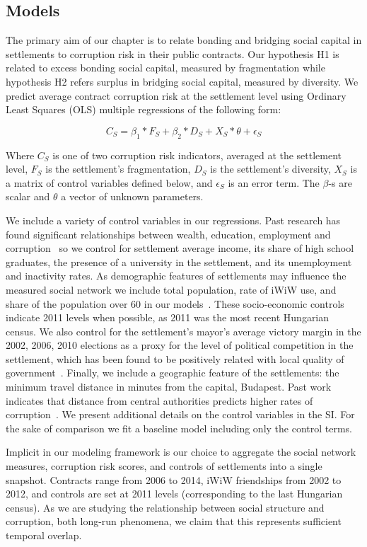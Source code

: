 \subsection{Models}
The primary aim of our chapter is to relate bonding and bridging social capital in settlements to corruption risk in their public contracts. Our hypothesis H1 is related to excess bonding social capital, measured by fragmentation while hypothesis H2 refers surplus in bridging social capital, measured by diversity. We predict average contract corruption risk at the settlement level using Ordinary Least Squares (OLS) multiple regressions of the following form:

$$C_{S} = \beta_{1} * F_{S} + \beta_{2}*D_{S} + X_{S}*\theta + \epsilon_{S}$$

Where $C_{S}$ is one of two corruption risk indicators, averaged at the settlement level, $F_{S}$ is the settlement's fragmentation, $D_{S}$ is the settlement's diversity, $X_{S}$ is a matrix of control variables defined below, and $\epsilon_{S}$ is an error term. The $\beta$-s are scalar and $\theta$ a vector of  unknown parameters.

We include a variety of control variables in our regressions. Past research has found significant relationships between wealth, education, employment and corruption~\cite{mungiu2013controlling} so we control for settlement average income, its share of high school graduates, the presence of a university in the settlement, and its unemployment and inactivity rates. As demographic features of settlements may influence the measured social network we include total population, rate of iWiW use, and share of the population over 60 in our models~\cite{pfeil2009age}. These socio-economic controls indicate 2011 levels when possible, as 2011 was the most recent Hungarian census. We also control for the settlement's mayor's average victory margin in the 2002, 2006, 2010 elections as a proxy for the level of political competition in the settlement, which has been found to be positively related with local quality of government~\cite{broms2017procurement}. Finally, we include a geographic feature of the settlements: the minimum travel distance in minutes from the capital, Budapest. Past work indicates that distance from central authorities predicts higher rates of corruption~\cite{campante2014isolated}. We present additional details on the control variables in the SI. For the sake of comparison we fit a baseline model including only the control terms.

Implicit in our modeling framework is our choice to aggregate the social network measures, corruption risk scores, and controls of settlements into a single snapshot. Contracts range from 2006 to 2014, iWiW friendships from 2002 to 2012, and controls are set at 2011 levels (corresponding to the last Hungarian census). As we are studying the relationship between social structure and corruption, both long-run phenomena, we claim that this represents sufficient temporal overlap.

